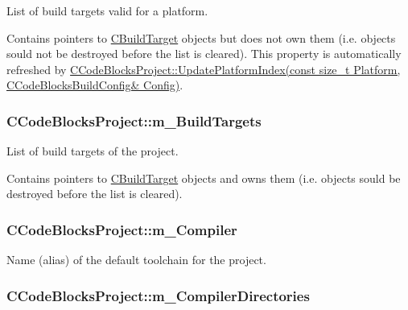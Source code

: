 List of build targets valid for a platform. 

Contains pointers to \hyperlink{classCBuildTarget}{C\-Build\-Target} objects but does not own them (i.\-e. objects sould not be destroyed before the list is cleared). This property is automatically refreshed by \hyperlink{classCCodeBlocksProject_a0456bbc2433f541b3409aa0722c9e19c}{C\-Code\-Blocks\-Project\-::\-Update\-Platform\-Index(const size\-\_\-t Platform, C\-Code\-Blocks\-Build\-Config\& Config)}. \hypertarget{classCCodeBlocksProject_a52d04e025e60af9d48f9e2f09cb02ab9}{
\subsubsection[{m\-\_\-\-Build\-Targets}]{\setlength{\rightskip}{0pt plus 5cm}C\-Code\-Blocks\-Project\-::m\-\_\-\-Build\-Targets\hspace{0.3cm}{\ttfamily [private]}}}\label{classCCodeBlocksProject_a52d04e025e60af9d48f9e2f09cb02ab9}


List of build targets of the project. 

Contains pointers to \hyperlink{classCBuildTarget}{C\-Build\-Target} objects and owns them (i.\-e. objects sould be destroyed before the list is cleared). \hypertarget{classCCodeBlocksProject_a5a814ce2b3e1d40d77920b3c65873af0}{
\subsubsection[{m\-\_\-\-Compiler}]{\setlength{\rightskip}{0pt plus 5cm}C\-Code\-Blocks\-Project\-::m\-\_\-\-Compiler\hspace{0.3cm}{\ttfamily [private]}}}\label{classCCodeBlocksProject_a5a814ce2b3e1d40d77920b3c65873af0}


Name (alias) of the default toolchain for the project. 

\hypertarget{classCCodeBlocksProject_a64dfc22099c2b4456d401627bb7d23ee}{
\subsubsection[{m\-\_\-\-Compiler\-Directories}]{\setlength{\rightskip}{0pt plus 5cm}C\-Code\-Blocks\-Project\-::m\-\_\-\-Compiler\-Directories\hspace{0.3cm}{\ttfamily [private]}}}\label{classCCodeBlocksProject_a64dfc22099c2b4456d401627bb7d23ee}


